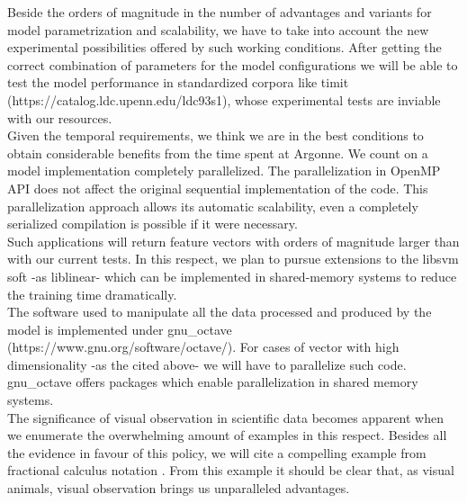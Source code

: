 \documentclass[11pt,a4paper]{article}
\begin{document}
Beside the orders of magnitude in the number of advantages and variants for 
model parametrization and scalability, we have to take into account the new experimental
possibilities offered by such working conditions.
After getting the correct combination of parameters for the model configurations
we will be able to test the model performance in standardized corpora like
\gls{timit} (https://catalog.ldc.upenn.edu/ldc93s1), whose experimental tests
are inviable with our resources. \\

Given the temporal requirements, we think we are in the best conditions to obtain
considerable benefits from the time spent at Argonne.
We count on a model implementation completely parallelized.
The parallelization in OpenMP API does not affect the original sequential implementation
of the code. This parallelization approach allows its automatic scalability, even a completely serialized
compilation is possible if it were necessary. \\

Such applications will return feature vectors with orders of magnitude larger than with our current tests.
In this respect, we plan to pursue extensions to the \gls{libsvm} soft -as \gls{liblinear}- which can be implemented in
shared-memory systems to reduce the training time dramatically. \\

The software used to manipulate all the data processed and produced by the model
is implemented under \gls{gnu_octave} (https://www.gnu.org/software/octave/).
For cases of vector with high dimensionality -as the cited above-
we will have to parallelize such code.
\gls{gnu_octave} offers packages which enable parallelization in shared memory systems. \\

The significance of visual observation in scientific data becomes apparent
when we enumerate the overwhelming amount of examples in this respect.
Besides all the evidence in favour of this policy, we will cite
a compelling example from fractional calculus notation \cite{Miller_1993}.
From this example it should be clear that, as visual animals,
visual observation brings us unparalleled advantages. \\

 \\
\end{document}
